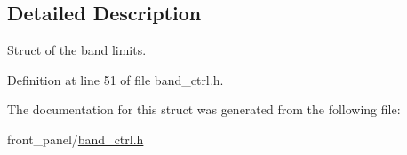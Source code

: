 \subsection{Detailed Description}
Struct of the band limits. 

Definition at line 51 of file band\_\-ctrl.h.

The documentation for this struct was generated from the following file:\begin{CompactItemize}
\item 
front\_\-panel/\hyperlink{band__ctrl_8h}{band\_\-ctrl.h}\end{CompactItemize}
